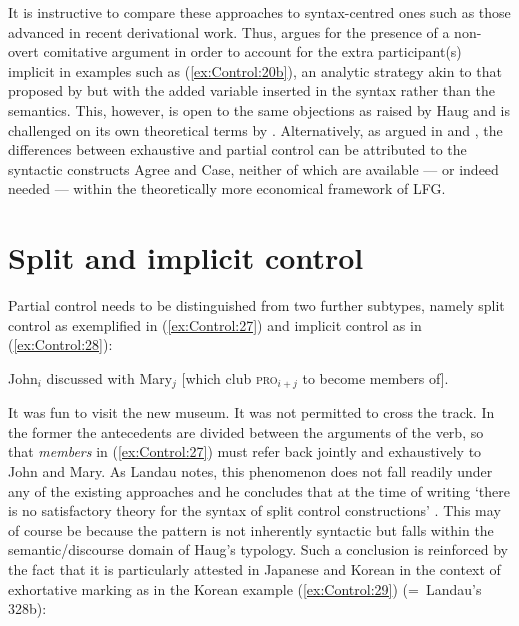 \documentclass[output=paper,hidelinks]{langscibook}
\begin{document}
It is instructive to compare these approaches to syntax-centred ones such as those advanced in recent derivational work. Thus, \citet{Sheehan2014} argues for the presence of a non-overt comitative argument in order to account for the extra participant(s) implicit in examples such as (\ref{ex:Control:20b}), an analytic strategy akin to that proposed by \citet{Asudeh05cont} but with the added variable inserted in the syntax rather than the semantics. This, however, is open to the same objections as raised by Haug and is challenged on its own theoretical terms by \citet{Landau2016}. Alternatively, as argued in \citet{Sheehan2018} and \citet{SevdaliSheehan2021}, the differences between exhaustive and partial control can be attributed to the syntactic constructs Agree and Case, neither of which are available --- or indeed needed --- within the theoretically more economical framework of LFG.

\section{Split and implicit control}
\label{sec:Control:5}

Partial control needs to be distinguished from two further subtypes, namely split control as exemplified in (\ref{ex:Control:27}) and implicit control as in (\ref{ex:Control:28}):

\ea\label{ex:Control:27}
John$_i$ discussed with Mary$_j$ [which club \textsc{pro}$_{i+j}$ to become members of].
\z

\ea\label{ex:Control:28}
\ea\label{ex:Control:28a} It was fun to visit the new museum.
\ex\label{ex:Control:28b} It was not permitted to cross the track.
\z\z
In the former the antecedents are divided between the arguments of the verb, so that \emph{members} in (\ref{ex:Control:27}) must refer back jointly and exhaustively to John and Mary. As Landau notes, this phenomenon does not fall readily under any of the existing approaches and he concludes that at the time of writing `there is no satisfactory theory for the syntax of split control constructions' \citep[174]{Landau2013}. This may of course be because the pattern is not inherently syntactic but falls within the semantic/discourse domain of Haug's typology. Such a conclusion is reinforced by the fact that it is particularly attested in Japanese and Korean in the context of exhortative marking as in the Korean example (\ref{ex:Control:29}) (=~Landau's 328b):
\end{document}

